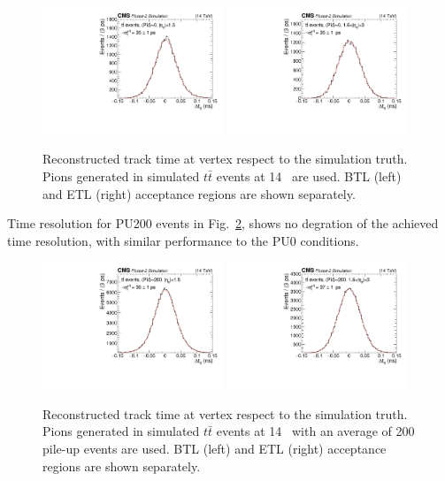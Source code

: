 \begin{figure}[!hbtp]
\centering
\includegraphics[width=0.48\textwidth]{fig/performance/ClusterAndTracks/res_t_pion_BTL_0PU.pdf}
\includegraphics[width=0.48\textwidth]{fig/performance/ClusterAndTracks/res_t_pion_ETL_0PU.pdf}
\caption{Reconstructed track time at vertex respect to the simulation truth. Pions generated in simulated $t\bar{t}$ events at 14~ are used. BTL (left) and ETL (right) acceptance regions are shown separately.}
\label{fig:trackt0vsgen}
\end{figure}

Time resolution for PU200 events in Fig.~\ref{fig:trackt0vsgen_PU200}, shows no degration of the achieved time resolution, with similar performance to the PU0 conditions.

\begin{figure}[!hbtp]
\centering
\includegraphics[width=0.48\textwidth]{fig/performance/ClusterAndTracks/res_t_pion_BTL.pdf}
\includegraphics[width=0.48\textwidth]{fig/performance/ClusterAndTracks/res_t_pion_ETL.pdf}
\caption{Reconstructed track time at vertex respect to the simulation truth. Pions generated in simulated $t\bar{t}$ events at 14~ with an average of 200 pile-up events are used. BTL (left) and ETL (right) acceptance regions are shown separately.}
\label{fig:trackt0vsgen_PU200}
\end{figure}

